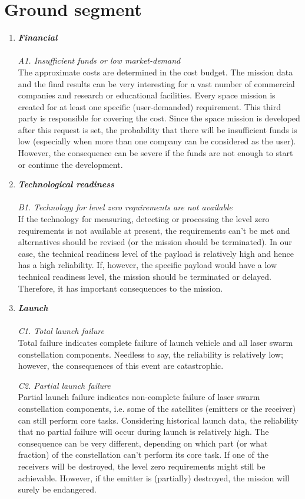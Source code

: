\section{Ground segment}
\label{blTRAGs}
\begin{enumerate}[A]
	\item  \textbf{\textit{Financial}} \\\\
\textit{A1. Insufficient funds or low market-demand}\\
The approximate costs are determined in the cost budget. The mission data and the final results can be very interesting for a vast number of commercial companies and research or educational facilities. Every space mission is created for at least one specific (user-demanded) requirement. This third party is responsible for covering the cost. Since the space mission is developed after this request is set, the probability that there will be insufficient funds is low (especially when more than one company can be considered as the user). However, the consequence can be severe if the funds are not enough to start or continue the development. 

	\item  \textbf{\textit{Technological readiness}} \\\\
\textit{B1. Technology for level zero requirements are not available}\\
If the technology for measuring, detecting or processing the level zero requirements is 	not available at present, the requirements can't be met and alternatives should be revised 	(or the mission should be terminated). In our case, the technical readiness level of the 	payload is relatively high and hence has a high reliability. If, however, the specific 	payload would have a low technical readiness level, the mission should be terminated or 	delayed. Therefore, it has important consequences to the mission.

	\item  \textbf{\textit{Launch}} \\\\
\textit{C1. Total launch failure}\\
Total failure indicates complete failure of launch vehicle and all laser swarm 	constellation components. Needless to say, the reliability is relatively low; however, the consequences of this event are catastrophic.

\textit{C2. Partial launch failure}\\
Partial launch failure indicates non-complete failure of laser swarm constellation components, i.e. some of the satellites (emitters or the receiver) can still perform core tasks. Considering historical launch data, the reliability that no partial failure will occur during launch is relatively high. The consequence can be very different, depending on which part (or what fraction) of the constellation can't perform its core task. If one of the receivers will be destroyed, the level zero requirements might still be achievable. However, if the emitter is (partially) destroyed, the mission will surely be endangered. 


\end{enumerate}
